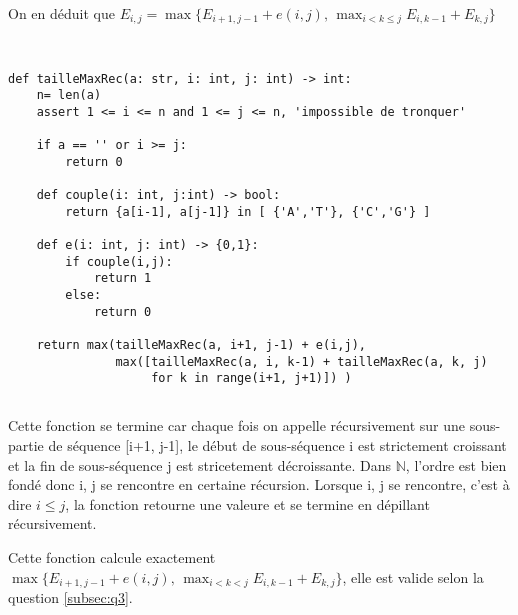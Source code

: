\documentclass[french]{article}
\begin{document}
\begin{center}
On en déduit que $E_{i,j} =\max\{E_{i+1,j-1} + e(i,j), \,   \displaystyle \max_{i<k \leq j}  E_{i,k-1} + E_{k,j}\}$
\par\end{center}

\pagebreak
\subsection{}
	\begin{lstlisting}[frame=single]  % Start your code-block

def tailleMaxRec(a: str, i: int, j: int) -> int:
    n= len(a)
    assert 1 <= i <= n and 1 <= j <= n, 'impossible de tronquer'
    
    if a == '' or i >= j:
        return 0

    def couple(i: int, j:int) -> bool:
        return {a[i-1], a[j-1]} in [ {'A','T'}, {'C','G'} ]
    
    def e(i: int, j: int) -> {0,1}:
        if couple(i,j):
            return 1
        else:
            return 0

    return max(tailleMaxRec(a, i+1, j-1) + e(i,j),
               max([tailleMaxRec(a, i, k-1) + tailleMaxRec(a, k, j)
                    for k in range(i+1, j+1)]) )
	\end{lstlisting}


\subsection{}
Cette fonction se termine car chaque fois on appelle récursivement sur une sous-partie de séquence [i+1, j-1], le début de sous-séquence i est strictement croissant et la fin de sous-séquence j est stricetement décroissante. Dans $\mathbb{N}$, l'ordre est bien fondé donc i, j se rencontre en certaine récursion. Lorsque i, j se rencontre, c'est à dire $i \leq j$, la fonction retourne une valeure et se termine en dépillant récursivement.
\par
Cette fonction calcule exactement $\max\{E_{i+1,j-1} + e(i,j), \,    \max_{i<k<j}  E_{i,k-1} + E_{k,j}\}$, elle est valide selon la question \ref{subsec:q3}.

\subsection{}
\end{document}
